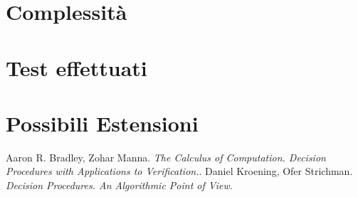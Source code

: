 \documentclass[a4paper, 11pt]{article}
\begin{document}
\section*{Complessità}

\section*{Test effettuati}

\section*{Possibili Estensioni}

\begin{thebibliography}{2}
 Aaron R. Bradley, Zohar Manna. \emph{The Calculus of Computation. Decision Procedures with Applications to Verification.}.
  Daniel Kroening, Ofer Strichman. \emph{Decision Procedures. An Algorithmic Point of View}.
\end{thebibliography}
\end{document}
